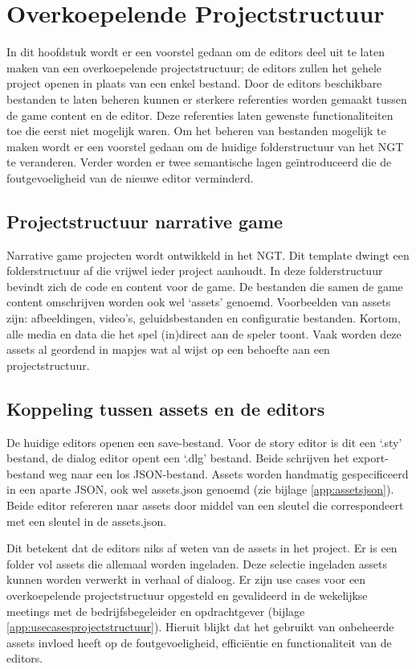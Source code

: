 \chapter{Overkoepelende Projectstructuur}
\label{ch:overkoepelendeprojectstructuur}
In dit hoofdstuk wordt er een voorstel gedaan om de editors deel uit te laten maken van een overkoepelende projectstructuur; de editors zullen het gehele project openen in plaats van een enkel bestand. Door de editors beschikbare bestanden te laten beheren kunnen er sterkere referenties worden gemaakt tussen de game content en de editor. Deze referenties laten gewenste functionaliteiten toe die eerst niet mogelijk waren. Om het beheren van bestanden mogelijk te maken wordt er een voorstel gedaan om de huidige folderstructuur van het NGT te veranderen. Verder worden er twee semantische lagen geïntroduceerd die de foutgevoeligheid van de nieuwe editor verminderd.

\section{Projectstructuur narrative game}
Narrative game projecten wordt ontwikkeld in het NGT. Dit template dwingt een folderstructuur af die vrijwel ieder project aanhoudt. In deze folderstructuur bevindt zich de code en content voor de game. De bestanden die samen de game content omschrijven worden ook wel ‘assets’ genoemd. Voorbeelden van assets zijn: afbeeldingen, video’s, geluidsbestanden en configuratie bestanden. Kortom, alle media en data die het spel (in)direct aan de speler toont. Vaak worden deze assets al geordend in mapjes wat al wijst op een behoefte aan een projectstructuur.

\section{Koppeling tussen assets en de editors}
De huidige editors openen een save-bestand. Voor de story editor is dit een ‘.sty’ bestand, de dialog editor opent een ‘.dlg’ bestand. Beide schrijven het export-bestand weg naar een los JSON-bestand. Assets worden handmatig gespecificeerd in een aparte JSON, ook wel assets.json genoemd (zie bijlage \autoref{app:assetsjson}). Beide editor refereren naar assets door middel van een sleutel die correspondeert met een sleutel in de assets.json. 

Dit betekent dat de editors niks af weten van de assets in het project. Er is een folder vol assets die allemaal worden ingeladen. Deze selectie ingeladen assets kunnen worden verwerkt in verhaal of dialoog. Er zijn use cases voor een overkoepelende projectstructuur opgesteld en gevalideerd in de wekelijkse meetings met de bedrijfsbegeleider en opdrachtgever (bijlage \autoref{app:usecasesprojectstructuur}). Hieruit blijkt dat het gebruikt van onbeheerde assets invloed heeft op de foutgevoeligheid, efficiëntie en functionaliteit van de editors. 

